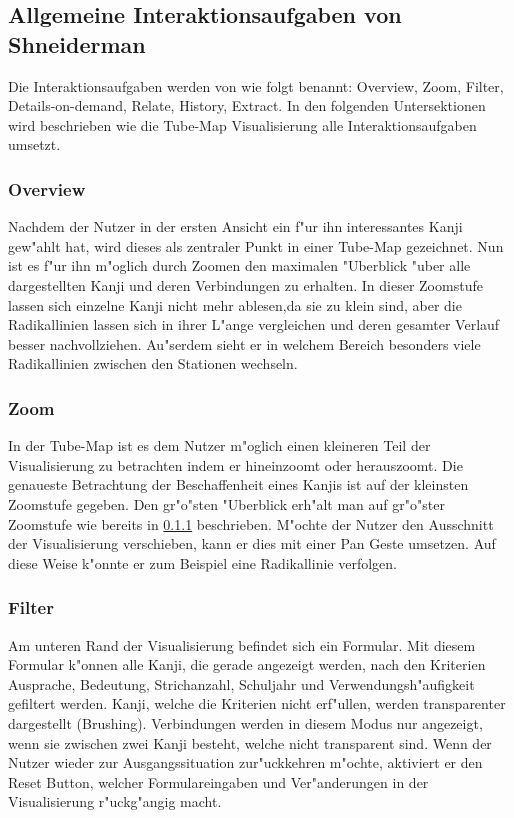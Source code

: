 \subsection{Allgemeine Interaktionsaufgaben von Shneiderman}
Die Interaktionsaufgaben werden von \cite{eyeshaveit96} wie folgt benannt: Overview, Zoom, Filter, Details-on-demand, Relate, History, Extract.  In den folgenden Untersektionen wird beschrieben wie die Tube-Map Visualisierung alle Interaktionsaufgaben umsetzt. 

\subsubsection{Overview}\label{Overview}
Nachdem der Nutzer in der ersten Ansicht ein f"ur ihn interessantes Kanji gew"ahlt hat, wird dieses als zentraler Punkt in einer Tube-Map gezeichnet. Nun ist es f"ur ihn m"oglich durch Zoomen den maximalen "Uberblick "uber alle dargestellten Kanji und deren Verbindungen zu erhalten. In dieser Zoomstufe lassen sich einzelne Kanji nicht mehr ablesen,da sie zu klein sind, aber die Radikallinien lassen sich in ihrer L"ange vergleichen und deren gesamter Verlauf besser nachvollziehen. Au"serdem sieht er in welchem Bereich besonders viele Radikallinien zwischen den Stationen wechseln.

\subsubsection{Zoom}
In der Tube-Map ist es dem Nutzer m"oglich einen kleineren Teil der Visualisierung zu betrachten indem er hineinzoomt oder herauszoomt. Die genaueste Betrachtung der Beschaffenheit eines Kanjis ist auf der kleinsten Zoomstufe gegeben. Den gr"o"sten "Uberblick erh"alt man auf gr"o"ster Zoomstufe wie bereits in \ref{Overview} beschrieben. M"ochte der Nutzer den Ausschnitt der Visualisierung verschieben, kann er dies mit einer Pan Geste umsetzen. Auf diese Weise k"onnte er zum Beispiel eine Radikallinie verfolgen.

\subsubsection{Filter}\label{Filter}
Am unteren Rand der Visualisierung befindet sich ein Formular. Mit diesem Formular k"onnen alle Kanji, die gerade angezeigt werden, nach den Kriterien Ausprache, Bedeutung, Strichanzahl, Schuljahr und Verwendungsh"aufigkeit gefiltert werden. Kanji, welche die Kriterien nicht erf"ullen, werden transparenter dargestellt (Brushing). Verbindungen werden in diesem Modus nur angezeigt, wenn sie zwischen zwei Kanji besteht, welche nicht transparent sind. Wenn der Nutzer wieder zur Ausgangssituation zur"uckkehren m"ochte, aktiviert er den Reset Button, welcher Formulareingaben und Ver"anderungen in der Visualisierung r"uckg"angig macht.

